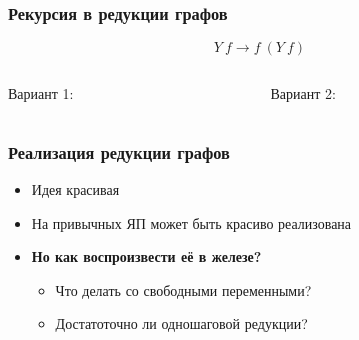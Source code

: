 \begin{frame}
    \frametitle{Рекурсия в редукции графов}

    \[Y \ f \rightarrow f\ (Y\ f) \]
    \begin{columns}[T]
        \begin{column}{0.5\textwidth}
            Вариант 1:
            \begin{figure}
            \end{figure}
        \end{column}
        \begin{column}[T]{0.5\textwidth}
            Вариант 2:
            \begin{figure}
            \end{figure}
        \end{column}
    \end{columns}
\end{frame}

\begin{frame}
    \frametitle{Реализация редукции графов}

    \begin{itemize}
        \item Идея красивая
        \item<+-> На привычных ЯП может быть красиво реализована
        \item<+-| alert@+> \textbf{Но как воспроизвести её в железе?}
              \begin{itemize}
                  \item Что делать со свободными переменными?
                  \item Достатоточно ли одношаговой редукции?
              \end{itemize}
    \end{itemize}
\end{frame}

